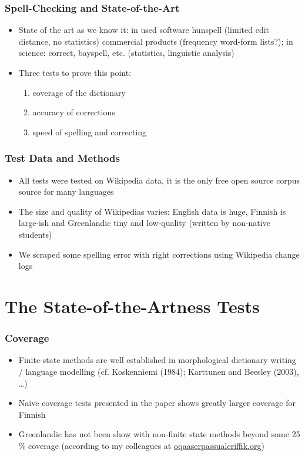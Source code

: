 \documentclass[t,12pt]{beamer}
\begin{document}
\begin{frame}
    \frametitle{Spell-Checking and State-of-the-Art}
    \begin{itemize}
        \item State of the art as we know it: in used software hunspell (limited
            edit distance, no statistics) commercial products (frequency word-form lists?); in science: correct, bayspell, etc. (statistics, linguistic analysis)
        \item Three tests to prove this point: \begin{enumerate}
                \item coverage of the dictionary
                \item accuracy of corrections
                \item speed of spelling and correcting
            \end{enumerate}
    \end{itemize}
\end{frame}

\begin{frame}
    \frametitle{Test Data and Methods}
    \begin{itemize}
        \item All tests were tested on Wikipedia data, it is the only free
            open source corpus source for many languages
        \item The size and quality of Wikipedias varies: English data is
            huge, Finnish is large-ish and Greenlandic tiny and low-quality
            (written by non-native students)

        \item We scraped some spelling error with right corrections using
            Wikipedia change logs
    \end{itemize}
\end{frame}

\section{The State-of-the-Artness Tests}

\begin{frame}
    \frametitle{Coverage}
    \begin{itemize}
        \item Finite-state methods are well established in morphological
            dictionary writing / language modelling (cf. 
            Koskenniemi (1984); Karttunen and Beesley (2003), \ldots)
        \item Naive coverage tests presented in the paper shows greatly
            larger coverage for Finnish
        \item Greenlandic has not been show with non-finite state methods
            beyond some 25 \% coverage (according to my colleagues at
            \url{oqaaserpassualeriffik.org})
    \end{itemize}
\end{frame}
\end{document}
